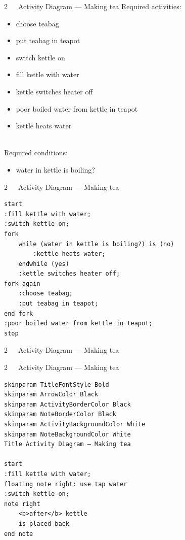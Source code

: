 \documentclass{beamer}
\begin{document}
\begin{frame}{2~~~Activity Diagram — Making tea}
Required \alert{activities}:
\begin{itemize}
\item choose teabag
\item put teabag in teapot
\item switch kettle on
\item fill kettle with water
\item kettle switches heater off
\item poor boiled water from kettle in teapot
\item kettle heats water
\end{itemize}
\mbox{}\\
Required \alert{conditions}:
\begin{itemize}
\item water in kettle is boiling?
\end{itemize}
\end{frame}

\begin{frame}[fragile]{2~~~Activity Diagram — Making tea}
\begin{verbatim}
start
:fill kettle with water;
:switch kettle on;
fork
    while (water in kettle is boiling?) is (no)
        :kettle heats water;
    endwhile (yes)
    :kettle switches heater off;
fork again
    :choose teabag;
    :put teabag in teapot;
end fork
:poor boiled water from kettle in teapot;
stop
\end{verbatim}
\end{frame}

\begin{frame}{2~~~Activity Diagram — Making tea}
\begin{figure}
\def\centering\svgwidth{\textwidth}
\resizebox{!}{.7\textheight}{}
\end{figure}
\end{frame}

\begin{frame}[fragile]{2~~~Activity Diagram — Making tea}
\begin{verbatim}
skinparam TitleFontStyle Bold
skinparam ArrowColor Black
skinparam ActivityBorderColor Black
skinparam NoteBorderColor Black
skinparam ActivityBackgroundColor White
skinparam NoteBackgroundColor White
Title Activity Diagram — Making tea

start
:fill kettle with water;
floating note right: use tap water
:switch kettle on;
note right
    <b>after</b> kettle
    is placed back
end note
\end{verbatim}
\end{frame}
\end{document}
